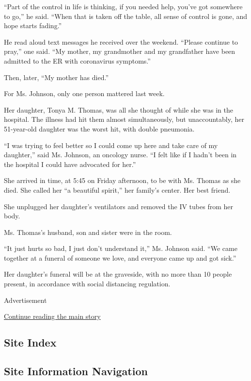 ``Part of the control in life is thinking, if you needed help, you've
got somewhere to go,'' he said. ``When that is taken off the table, all
sense of control is gone, and hope starts fading.''

He read aloud text messages he received over the weekend. ``Please
continue to pray,'' one said. ``My mother, my grandmother and my
grandfather have been admitted to the ER with coronavirus symptoms.''

Then, later, ``My mother has died.''

For Ms. Johnson, only one person mattered last week.

Her daughter, Tonya M. Thomas, was all she thought of while she was in
the hospital. The illness had hit them almost simultaneously, but
unaccountably, her 51-year-old daughter was the worst hit, with double
pneumonia.

``I was trying to feel better so I could come up here and take care of
my daughter,'' said Ms. Johnson, an oncology nurse. ``I felt like if I
hadn't been in the hospital I could have advocated for her.''

She arrived in time, at 5:45 on Friday afternoon, to be with Ms. Thomas
as she died. She called her ``a beautiful spirit,'' her family's center.
Her best friend.

She unplugged her daughter's ventilators and removed the IV tubes from
her body.

Ms. Thomas's husband, son and sister were in the room.

``It just hurts so bad, I just don't understand it,'' Ms. Johnson said.
``We came together at a funeral of someone we love, and everyone came up
and got sick.''

Her daughter's funeral will be at the graveside, with no more than 10
people present, in accordance with social distancing regulation.

Advertisement

\protect\hyperlink{after-bottom}{Continue reading the main story}

\hypertarget{site-index}{%
\subsection{Site Index}\label{site-index}}

\hypertarget{site-information-navigation}{%
\subsection{Site Information
Navigation}\label{site-information-navigation}}

